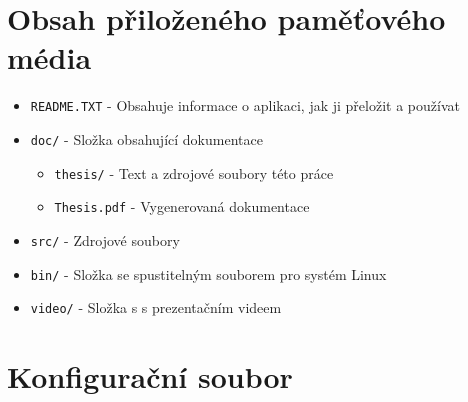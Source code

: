 
\chapter{Obsah přiloženého paměťového média}

\begin{itemize}  
\item \texttt{README.TXT} - Obsahuje informace o aplikaci, jak ji přeložit a používat
\item \texttt{doc/} - Složka obsahující dokumentace
\begin{itemize}
\item \texttt{thesis/} - Text a zdrojové soubory této práce
\item \texttt{Thesis.pdf} - Vygenerovaná dokumentace 
\end{itemize}
\item \texttt{src/} - Zdrojové soubory
\item \texttt{bin/} - Složka se spustitelným souborem pro systém Linux
\item \texttt{video/} - Složka s s prezentačním videem
\end{itemize}


\chapter{Konfigurační soubor}
\label{appendix:configfile}

